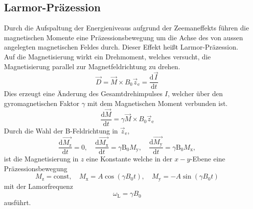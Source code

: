 \subsection{Larmor-Präzession}%
\label{sub:larmor_praezession}
Durch die Aufspaltung der Energieniveaus aufgrund der Zeemaneffekts führen
die magnetischen Momente eine Präzessionsbewegung um die Achse des von aussen
angelegten magnetischen Feldes durch. 
Dieser Effekt heißt Larmor-Präzession. 
Auf die Magnetisierung wirkt ein Drehmoment, welches versucht, die Magnetisierung
parallel zur Magnetfeldrichtung zu drehen.
\begin{equation}
		\label{eq:dreh}
		\vec{D} = \vec{M} \times B_0 \vec{z}_\text{e} = \frac{\text{d} \vec{I}}{\text{d}t} 
\end{equation}
Dies erzeugt eine Änderung des Gesamtdrehimpulses $I$, welcher über den
gyromagnetischen Faktor $\gamma$ mit dem Magnetischen Moment verbunden ist.
\begin{equation}
		\label{eq:dreh}
		\frac{\text{d} \vec{M}}{\text{d}t} = \gamma \vec{M} \times B_0
		\vec{z}_\text{e}
\end{equation}
Durch die Wahl der B-Feldrichtung in $\vec{z}_\text{e}$,
\begin{equation}
		\label{eq:ablM}
		\frac{\text{d} \vec{M_\text{z}}}{\text{d}t} = 0 ,  \hspace{1em}
		\frac{\text{d} \vec{M_\text{x}}}{\text{d}t} = \gamma \text{B}_0
		M_\text{y}, \hspace{1em}
		\frac{\text{d} \vec{M_\text{y}}}{\text{d}t} = \gamma \text{B}_0
		M_\text{x}, 
\end{equation}
 ist die Magnetisierung in $z$ eine Konstante welche in der $x-y$-Ebene
 eine Präzessionsbewegung 
\begin{equation}
		\label{eq:schwM}
		M_\text{z} = \text{const}, \hspace{1em} M_\text{x} = A \cos(\gamma B_0
		t ), \hspace{1em} M_\text{y} = -A \sin(\gamma B_0 t)
\end{equation}
mit der Lamorfrequenz
\begin{equation}
		\label{eq:larmorf}
		\omega_\text{L} = \gamma B_0
\end{equation}
ausführt. 

